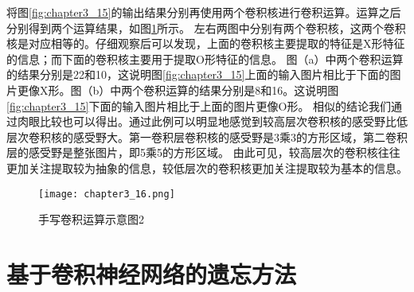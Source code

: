 将图\ref{fig:chapter3_15}的输出结果分别再使用两个卷积核进行卷积运算。运算之后分别得到两个运算结果，如图\ref{fig:chapter3_16}所示。
左右两图中分别有两个卷积核，这两个卷积核是对应相等的。仔细观察后可以发现，上面的卷积核主要提取的特征是X形特征的信息；而下面的卷积核主要用于提取O形特征的信息。
图（a）中两个卷积运算的结果分别是22和10，这说明图\ref{fig:chapter3_15}上面的输入图片相比于下面的图片更像X形。图（b）中两个卷积运算的结果分别是8和16。这说明图\ref{fig:chapter3_15}下面的输入图片相比于上面的图片更像O形。
相似的结论我们通过肉眼比较也可以得出。通过此例可以明显地感觉到较高层次卷积核的感受野比低层次卷积核的感受野大。第一卷积层卷积核的感受野是3乘3的方形区域，第二卷积层的感受野是整张图片，即5乘5的方形区域。
由此可见，较高层次的卷积核往往更加关注提取较为抽象的信息，较低层次的卷积核更加关注提取较为基本的信息。
\begin{figure}
    \centering
    \texttt{[image: chapter3\_16.png]}
    \caption{手写卷积运算示意图2}
    \label{fig:chapter3_16}
\end{figure}

\section{基于卷积神经网络的遗忘方法}
